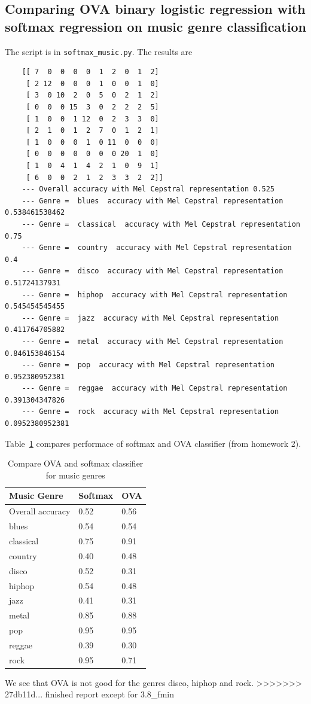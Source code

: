\documentclass{article}
\begin{document}
\subsection{Comparing OVA binary logistic regression with softmax regression on music genre classification}
The script is in \verb|softmax_music.py|. The results are
\begin{lstlisting}
	[[ 7  0  0  0  0  1  2  0  1  2]
	 [ 2 12  0  0  0  1  0  0  1  0]
	 [ 3  0 10  2  0  5  0  2  1  2]
	 [ 0  0  0 15  3  0  2  2  2  5]
	 [ 1  0  0  1 12  0  2  3  3  0]
	 [ 2  1  0  1  2  7  0  1  2  1]
	 [ 1  0  0  0  1  0 11  0  0  0]
	 [ 0  0  0  0  0  0  0 20  1  0]
	 [ 1  0  4  1  4  2  1  0  9  1]
	 [ 6  0  0  2  1  2  3  3  2  2]]
	--- Overall accuracy with Mel Cepstral representation 0.525
	--- Genre =  blues  accuracy with Mel Cepstral representation 0.538461538462
	--- Genre =  classical  accuracy with Mel Cepstral representation 0.75
	--- Genre =  country  accuracy with Mel Cepstral representation 0.4
	--- Genre =  disco  accuracy with Mel Cepstral representation 0.51724137931
	--- Genre =  hiphop  accuracy with Mel Cepstral representation 0.545454545455
	--- Genre =  jazz  accuracy with Mel Cepstral representation 0.411764705882
	--- Genre =  metal  accuracy with Mel Cepstral representation 0.846153846154
	--- Genre =  pop  accuracy with Mel Cepstral representation 0.952380952381
	--- Genre =  reggae  accuracy with Mel Cepstral representation 0.391304347826
	--- Genre =  rock  accuracy with Mel Cepstral representation 0.0952380952381
\end{lstlisting}

Table~\ref{table:3.8ova} compares performace of softmax and OVA classifier (from homework 2).

\begin{table}[h]
\caption{Compare OVA and softmax classifier for music genres} \centering
\begin{tabular}{|l|l|l|}
\hline
Music Genre & Softmax & OVA\\
\hline\hline
Overall accuracy & 0.52 & 0.56 \\
blues  & 0.54 & 0.54 \\

classical  & 0.75 & 0.91\\

country  & 0.40 & 0.48 \\

disco  & 0.52 & 0.31 \\

hiphop  & 0.54 & 0.48 \\

jazz  & 0.41 & 0.31 \\

metal  & 0.85 & 0.88 \\

pop & 0.95 & 0.95 \\

reggae & 0.39 & 0.30 \\

rock & 0.95 & 0.71 \\
\hline
\end{tabular} \label{table:3.8ova}
\end{table}

We see that OVA is not good for the genres disco, hiphop and rock.
>>>>>>> 27db11d... finished report except for 3.8_fmin
\end{document}
